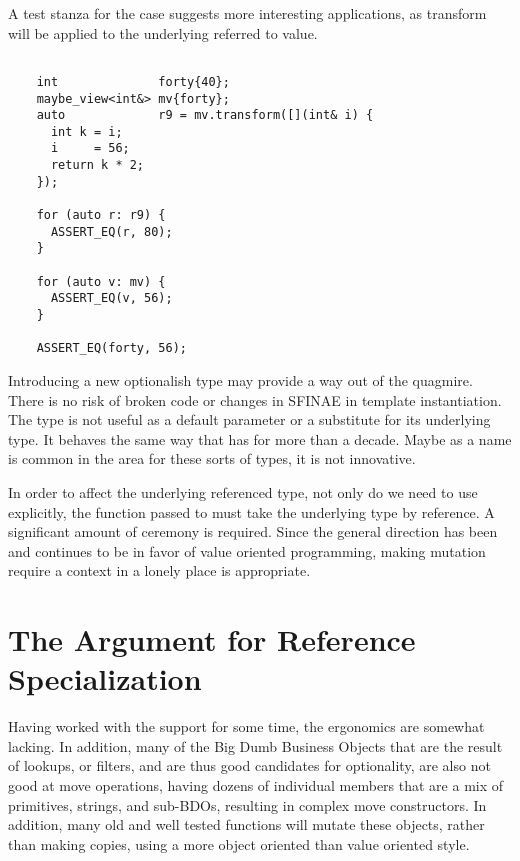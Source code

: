 \documentclass[a4paper,10pt,oneside,openany,final,article]{memoir}
\begin{document}
A test stanza for the  case suggests more interesting applications, as transform will be applied to the underlying referred to value.

\begin{minipage}[t]{\linewidth}
  \begin{verbatim}

    int              forty{40};
    maybe_view<int&> mv{forty};
    auto             r9 = mv.transform([](int& i) {
      int k = i;
      i     = 56;
      return k * 2;
    });

    for (auto r: r9) {
      ASSERT_EQ(r, 80);
    }

    for (auto v: mv) {
      ASSERT_EQ(v, 56);
    }

    ASSERT_EQ(forty, 56);

  \end{verbatim}
\end{minipage}

Introducing a new optionalish type may provide a way out of the  quagmire. There is no risk of broken code or changes in SFINAE in template instantiation. The type  is not useful as a default parameter or a substitute for its underlying type. It behaves the same way that  has for more than a decade. Maybe as a name is common in the area for these sorts of types, it is not innovative.

In order to affect the underlying referenced type, not only do we need to use  explicitly, the function passed to  must take the underlying type by reference. A significant amount of ceremony is required. Since the general direction has been and continues to be in favor of value oriented programming, making mutation require a context in a lonely place is appropriate.

\section{The Argument for Reference Specialization}
Having worked with the  support for some time, the ergonomics are somewhat lacking. In addition, many of the Big Dumb Business Objects that are the result of lookups, or filters, and are thus good candidates for optionality, are also not good at move operations, having dozens of individual members that are a mix of primitives, strings, and sub-BDOs, resulting in complex move constructors. In addition, many old and well tested functions will mutate these objects, rather than making copies, using a more object oriented than value oriented style.
\end{document}
